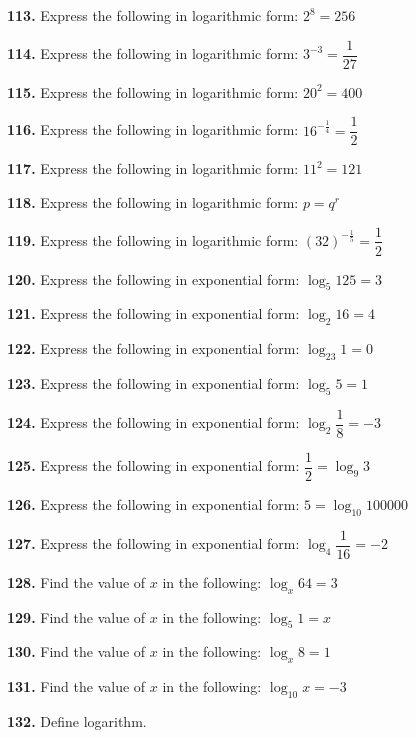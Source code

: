 \documentclass[11pt]{article}
\begin{document}
\bigskip
\noindent\textbf{113.} Express the following in logarithmic form: $2^8=256$

\bigskip
\noindent\textbf{114.} Express the following in logarithmic form: $3^{-3}=\dfrac{1}{27}$

\bigskip
\noindent\textbf{115.} Express the following in logarithmic form: $20^2=400$

\bigskip
\noindent\textbf{116.} Express the following in logarithmic form: $16^{-\frac{1}{4}}=\dfrac{1}{2}$

\bigskip
\noindent\textbf{117.} Express the following in logarithmic form: $11^2=121$

\bigskip
\noindent\textbf{118.} Express the following in logarithmic form: $p=q^r$

\bigskip
\noindent\textbf{119.} Express the following in logarithmic form: $(32)^{-\frac{1}{5}}=\dfrac{1}{2}$

\bigskip
\noindent\textbf{120.} Express the following in exponential form: $\log_5 125=3$

\bigskip
\noindent\textbf{121.} Express the following in exponential form: $\log_2 16=4$

\bigskip
\noindent\textbf{122.} Express the following in exponential form: $\log_{23}1=0$

\bigskip
\noindent\textbf{123.} Express the following in exponential form: $\log_5 5=1$

\bigskip
\noindent\textbf{124.} Express the following in exponential form: $\log_2 \dfrac{1}{8}=-3$

\bigskip
\noindent\textbf{125.} Express the following in exponential form: $\dfrac{1}{2}=\log_9 3$

\bigskip
\noindent\textbf{126.} Express the following in exponential form: $5=\log_{10}100000$

\bigskip
\noindent\textbf{127.} Express the following in exponential form: $\log_4 \dfrac{1}{16}=-2$

\bigskip
\noindent\textbf{128.} Find the value of $x$ in the following: $\log_x 64=3$

\bigskip
\noindent\textbf{129.} Find the value of $x$ in the following: $\log_5 1= x$

\bigskip
\noindent\textbf{130.} Find the value of $x$ in the following: $\log_x 8=1$

\bigskip
\noindent\textbf{131.} Find the value of $x$ in the following: $\log_{10} x=-3$

\bigskip
\noindent\textbf{132.} Define logarithm.
\end{document}
